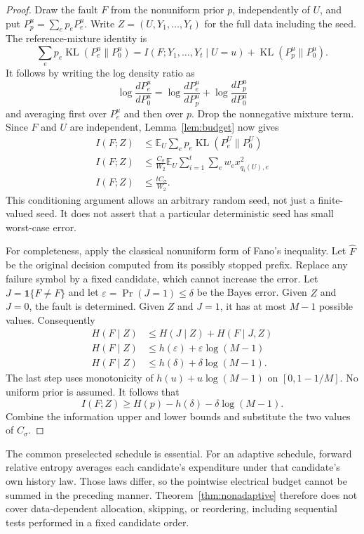 \documentclass[11pt,letterpaper]{article}
\DeclareMathOperator{\KL}{KL}
\begin{document}
\begin{proof}
Draw the fault $F$ from the nonuniform prior $p$, independently of $U$, and put $P_p^u=\sum_ep_eP_e^u$. Write $Z=(U,Y_1,\ldots,Y_t)$ for the full data including the seed. The reference-mixture identity is
\[
 \sum_ep_e\KL(P_e^u\|P_0^u)
 =I(F;Y_1,\ldots,Y_t\mid U=u)+\KL(P_p^u\|P_0^u).
\]
It follows by writing the log density ratio as
\[
 \log\frac{dP_e^u}{dP_0^u}
 =\log\frac{dP_e^u}{dP_p^u}+\log\frac{dP_p^u}{dP_0^u}
\]
and averaging first over $P_e^u$ and then over $p$. Drop the nonnegative mixture term. Since $F$ and $U$ are independent, Lemma~\ref{lem:budget} now gives
\[
 \begin{aligned}
 I(F;Z)
 &\le\mathbb E_U\sum_ep_e\KL(P_e^U\|P_0^U)\\
 I(F;Z)&\le\frac{C_\sigma}{W_2}\mathbb E_U
       \sum_{i=1}^t\sum_ew_ex_{q_i(U),e}^2\\
 I(F;Z)&\le\frac{tC_\sigma}{W_2}.
 \end{aligned}
\]
This conditioning argument allows an arbitrary random seed, not just a finite-valued seed. It does not assert that a particular deterministic seed has small worst-case error.

For completeness, apply the classical nonuniform form of Fano's inequality. Let $\widehat F$ be the original decision computed from its possibly stopped prefix. Replace any failure symbol by a fixed candidate, which cannot increase the error. Let $J=\mathbf 1\{\widehat F\ne F\}$ and let $\varepsilon=\Pr(J=1)\le\delta$ be the Bayes error. Given $Z$ and $J=0$, the fault is determined. Given $Z$ and $J=1$, it has at most $M-1$ possible values. Consequently
\[
 \begin{aligned}
 H(F\mid Z)
 &\le H(J\mid Z)+H(F\mid J,Z)\\
 H(F\mid Z)&\le h(\varepsilon)+\varepsilon\log(M-1)\\
 H(F\mid Z)&\le h(\delta)+\delta\log(M-1).
 \end{aligned}
\]
The last step uses monotonicity of $h(u)+u\log(M-1)$ on $[0,1-1/M]$. No uniform prior is assumed. It follows that
\[
 I(F;Z)\ge H(p)-h(\delta)-\delta\log(M-1).
\]
Combine the information upper and lower bounds and substitute the two values of $C_\sigma$.
\end{proof}

The common preselected schedule is essential. For an adaptive schedule, forward relative entropy averages each candidate's expenditure under that candidate's own history law. Those laws differ, so the pointwise electrical budget cannot be summed in the preceding manner. Theorem~\ref{thm:nonadaptive} therefore does not cover data-dependent allocation, skipping, or reordering, including sequential tests performed in a fixed candidate order.
\end{document}
